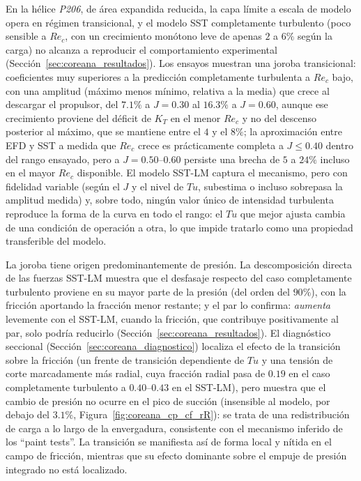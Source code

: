 En la hélice \textit{P206}, de área expandida reducida, la capa límite a escala
de modelo opera en régimen transicional, y el modelo SST completamente turbulento (poco sensible a $Re_c$, con un crecimiento monótono leve de apenas $2$ a $6\%$ según la carga) no alcanza a reproducir el comportamiento experimental
(Sección~\ref{sec:coreana_resultados}). Los ensayos muestran una joroba transicional:
coeficientes muy superiores a la predicción completamente turbulenta a $Re_c$ bajo,
con una amplitud (máximo menos mínimo, relativa a la media) que crece al descargar el
propulsor, del $7.1\%$ a $J=0.30$ al $16.3\%$ a $J=0.60$, aunque ese crecimiento proviene
del déficit de $K_T$ en el menor $Re_c$ y no del descenso posterior al máximo, que se
mantiene entre el $4$ y el $8\%$; la aproximación entre EFD y SST a medida que $Re_c$ crece es
prácticamente completa a $J\leq0.40$ dentro del rango ensayado, pero a $J=0.50$--$0.60$
persiste una brecha de $5$ a $24\%$ incluso en el mayor $Re_c$ disponible. El modelo
SST-LM captura el mecanismo, pero con fidelidad variable (según el $J$ y el nivel de $Tu$, subestima o incluso sobrepasa la amplitud medida) y, sobre todo, ningún valor
único de intensidad turbulenta reproduce la forma de la curva en todo el rango: el
$Tu$ que mejor ajusta cambia de una condición de operación a otra, lo que impide
tratarlo como una propiedad transferible del modelo.

La joroba tiene origen predominantemente de presión. La descomposición directa de las
fuerzas SST-LM muestra que el desfasaje respecto del caso completamente turbulento
proviene en su mayor parte de la presión (del orden del $90\%$), con la fricción
aportando la fracción menor restante; y el par lo confirma: \emph{aumenta} levemente con
el SST-LM, cuando la fricción, que contribuye positivamente al par, solo podría reducirlo
(Sección~\ref{sec:coreana_resultados}). El diagnóstico seccional
(Sección~\ref{sec:coreana_diagnostico}) localiza el efecto de la transición sobre la
fricción (un frente de transición dependiente de $Tu$ y una tensión de corte
marcadamente más radial, cuya fracción radial pasa de $0.19$ en el caso completamente
turbulento a $0.40$--$0.43$ en el SST-LM), pero muestra que el cambio de presión no
ocurre en el pico de succión (insensible al modelo, por debajo del $3.1\%$,
Figura~\ref{fig:coreana_cp_cf_rR}): se trata
de una redistribución de carga a lo largo de la envergadura, consistente con el
mecanismo inferido de los ``paint tests''. La transición se manifiesta así de forma
local y nítida en el campo de fricción, mientras que su efecto dominante sobre el
empuje de presión integrado no está localizado.

